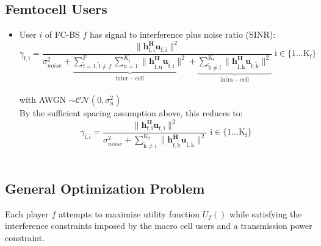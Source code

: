 \documentclass[12pt,a4paper]{report}
\begin{document}
\subsection{Femtocell Users}
\begin{itemize}

\item User $i$ of FC-BS $f$ has signal to interference plus noise ratio (SINR):
	\begin{equation*}
	\gamma_{\mathrm{f,i}} = \frac{\|\mathbf{h^H_{\mathrm{f,i}}u_{\mathrm{f,i}}}\|^2}
	{\sigma^2_{noise}   +
	\underbrace{
	 \sum_{\mathrm{\tilde{f}}=1,\mathrm{\tilde{f}}\neq f}^{\mathrm{F}} \sum_{\mathrm{u=1}}^{K_{\mathrm{\tilde{f}}}}
	\|\mathbf{h^H_{\mathrm{\tilde{f},u}}u_{\mathrm{\tilde{f},i}}}\|^2}_{\mathrm{inter-cell}}
	 + 
	 \underbrace{
	 \sum_{\mathrm{\tilde{k}\neq i}}^{\mathrm{K_f}}
	 \|\mathbf{h^H_{\mathrm{f,\tilde{k}}}u_{\mathrm{f,\tilde{k}}}}\|^2}_{\mathrm{intra-cell}}}
	  \; \mathrm{i \in \{1 ... K_f\}}\end{equation*}
\\
with AWGN $\sim \mathcal{CN}(0,\sigma^2_n)$
\\

By the sufficient spacing assumption above, this reduces to:
	\begin{equation*}
	\gamma_{\mathrm{f,i}} = \frac{\|\mathbf{h^H_{\mathrm{f,i}}u_{\mathrm{f,i}}}\|^2}
	{\sigma^2_{noise} 
	 + \sum_{\mathrm{\tilde{k}\neq i}}^{\mathrm{K_f}}
	  \|\mathbf{h^H_{\mathrm{f,\tilde{k}}}u_{\mathrm{f,\tilde{k}}}}\|^2}
	  \; \mathrm{i \in \{1 ... K_f\}}
	\end{equation*}
\\


\end{itemize}





\subsection{General Optimization Problem}\label{genproblem}

Each player $f$ attempts to maximize utility function $U_f()$ while satisfying the interference constraints imposed by the macro cell users and a transmission power constraint. 
\par
\end{document}
